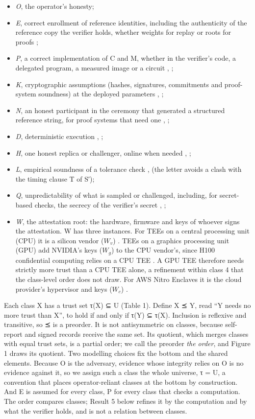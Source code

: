 \documentclass[11pt]{article}
\begin{document}
\begin{itemize}
\item \emph{O}, the operator's honesty;
\item \emph{E}, correct enrollment of reference identities, including the authenticity of the reference copy the verifier holds, whether weights for replay or roots for proofs \cite{B5};
\item \emph{P}, a correct implementation of C and M, whether in the verifier's code, a delegated program, a measured image or a circuit \cite{A23}, \cite{A30};
\item \emph{K}, cryptographic assumptions (hashes, signatures, commitments and proof-system soundness) at the deployed parameters \cite{A24}, \cite{A28};
\item \emph{N}, an honest participant in the ceremony that generated a structured reference string, for proof systems that need one \cite{A41}, \cite{A42};
\item \emph{D}, deterministic execution \cite{C1}, \cite{C10};
\item \emph{H}, one honest replica or challenger, online when needed \cite{C6}, \cite{C9};
\item \emph{L}, empirical soundness of a tolerance check \cite{C11}, \cite{C12} (the letter avoids a clash with the timing clause T of S′);
\item \emph{Q}, unpredictability of what is sampled or challenged, including, for secret-based checks, the secrecy of the verifier's secret \cite{C12}, \cite{C13};
\item \emph{W}, the attestation root: the hardware, firmware and keys of whoever signs the attestation. W has three instances. For TEEs on a central processing unit (CPU) it is a silicon vendor ($W_v$) \cite{B2}. TEEs on a graphics processing unit (GPU) add NVIDIA's keys ($W_g$) to the CPU vendor's, since H100 confidential computing relies on a CPU TEE \cite{B6}. A GPU TEE therefore needs strictly more trust than a CPU TEE alone, a refinement within class 4 that the class-level order does not draw. For AWS Nitro Enclaves it is the cloud provider's hypervisor and keys ($W_c$) \cite{B24}.
\end{itemize}

Each class X has a trust set τ(X) ⊆ U (Table 1). Define X ⪯ Y, read ``Y needs no more trust than X'', to hold if and only if τ(Y) ⊆ τ(X). Inclusion is reflexive and transitive, so ⪯ is a preorder. It is not antisymmetric on classes, because self-report and signed records receive the same set. Its quotient, which merges classes with equal trust sets, is a partial order; we call the preorder \emph{the order}, and Figure 1 draws its quotient. Two modelling choices fix the bottom and the shared elements. Because O is the adversary, evidence whose integrity relies on O is no evidence against it, so we assign such a class the whole universe, τ = U, a convention that places operator-reliant classes at the bottom by construction. And E is assumed for every class, P for every class that checks a computation. The order compares classes; Result 5 below refines it by the computation and by what the verifier holds, and is not a relation between classes.
\end{document}
